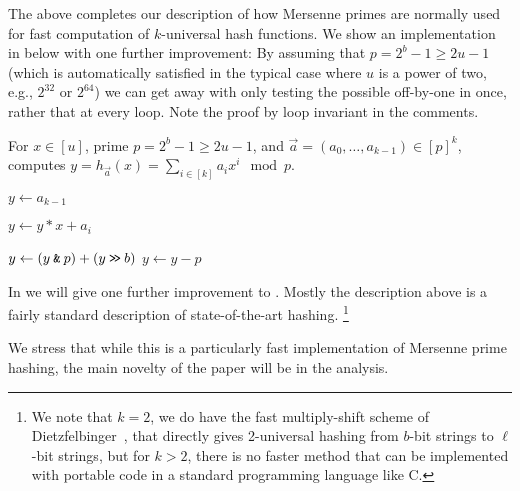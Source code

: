 \vspace{1em}

The above completes our description of how Mersenne primes are
normally used for fast computation of $k$-universal hash functions.
We show an implementation in  below with one further improvement:
By assuming that $p=2^b-1\geq 2u-1$
(which is automatically satisfied in the typical case where $u$ is a power
of two, e.g., $2^{32}$ or $2^{64}$)
we can get away with only testing the possible off-by-one in  once, rather that at every loop.
Note the proof by loop invariant in the comments.

\begin{algorithm}[H]
   \caption{
      For $x\in [u]$, prime $p=2^b-1\geq 2u-1$,
      and $\vec a=(a_0,\ldots,a_{k-1})\in[p]^k$,
      computes $y=h_{\vec a}(x)=\sum_{i\in[k]}a_i x^i\mod p$.
   }\label{alg:Mersenne}
   \begin{algorithmic}
      \State $y\gets a_{k-1}$

      \State $y\gets y*x+a_i$

      \State $y\gets (y\mathbin{\texttt{\&}} p)+(y\mathbin{\texttt{>\!>}} b)$
      \EndFor
      \State $y\gets y-p$
      \EndIf
   \end{algorithmic}
\end{algorithm}


In  we will give one further improvement to .
Mostly the description above is a fairly standard description of state-of-the-art hashing.
\footnote{We note that $k=2$, we do have the fast multiply-shift scheme of Dietzfelbinger~\cite{dietzfel96universal}, that directly gives 2-universal
hashing from $b$-bit strings to $\ell$-bit strings, but for $k>2$,
there is no faster method that can be implemented with portable code
in a standard programming language like C.}

We stress that while this is a particularly fast implementation of Mersenne prime hashing, the main novelty of the paper will be in the analysis.






